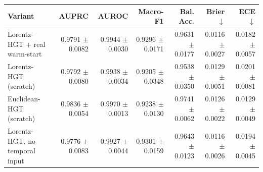 \begin{tabular}{lrrrrrr}
\toprule
Variant & AUPRC & AUROC & Macro-F1 & Bal. Acc. & Brier $\downarrow$ & ECE $\downarrow$ \\
\midrule
Lorentz-HGT + real warm-start & 0.9791 $\pm$ 0.0082 & 0.9944 $\pm$ 0.0030 & 0.9296 $\pm$ 0.0171 & 0.9631 $\pm$ 0.0177 & 0.0116 $\pm$ 0.0027 & 0.0182 $\pm$ 0.0057 \\
Lorentz-HGT (scratch) & 0.9792 $\pm$ 0.0080 & 0.9938 $\pm$ 0.0034 & 0.9205 $\pm$ 0.0348 & 0.9538 $\pm$ 0.0350 & 0.0129 $\pm$ 0.0051 & 0.0201 $\pm$ 0.0081 \\
Euclidean-HGT (scratch) & 0.9836 $\pm$ 0.0054 & 0.9970 $\pm$ 0.0013 & 0.9238 $\pm$ 0.0130 & 0.9741 $\pm$ 0.0062 & 0.0126 $\pm$ 0.0022 & 0.0129 $\pm$ 0.0049 \\
Lorentz-HGT, no temporal input & 0.9776 $\pm$ 0.0083 & 0.9927 $\pm$ 0.0044 & 0.9301 $\pm$ 0.0159 & 0.9643 $\pm$ 0.0123 & 0.0116 $\pm$ 0.0026 & 0.0194 $\pm$ 0.0045 \\
\bottomrule
\end{tabular}

